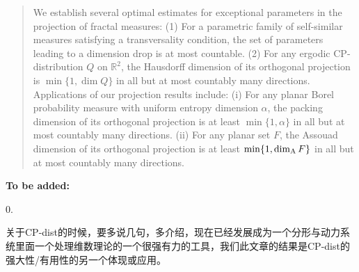 \documentclass[a4paper,11pt]{amsart}
\theoremstyle{definition}
\numberwithin{equation}{section}
\def\R{\mathbb R}
\begin{document}
\begin{abstract}

We establish several optimal estimates for exceptional parameters in the projection of fractal measures:
(1)	For a parametric family of self-similar measures satisfying a transversality condition, the set of parameters leading to a dimension drop is at most countable.
(2)	For any ergodic CP-distribution $Q$  on $\R^2$, the Hausdorff dimension of its orthogonal projection is $\min\{1, \dim Q\}$ in all but at most countably many directions.
Applications of our projection results  include:
(i) For any planar Borel probability measure with uniform entropy dimension $\alpha$, the packing dimension of its orthogonal projection is at least $\min\{1, \alpha\}$  in all but at most countably many directions.
(ii) For any planar set $F$, the Assouad dimension of its orthogonal projection is at least $ \min\{1, \dim_{\rm A} F\} $  in all but at most countably many directions.
\end{abstract}

\maketitle

\iffalse
{\bf {\color{blue}To be added:} }

0.  \begin{CJK}{UTF8}{gbsn} 关于CP-dist的时候，要多说几句，多介绍，现在已经发展成为一个分形与动力系统里面一个处理维数理论的一个很强有力的工具，我们此文章的结果是CP-dist的强大性/有用性的另一个体现或应用。 \end{CJK}
\end{document}
